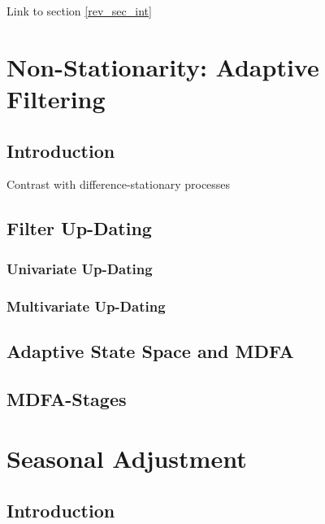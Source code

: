 \documentclass[a4paper]{book}
\begin{document}
Link to section \ref{rev_sec_int}








\chapter{Non-Stationarity: Adaptive Filtering}\label{ada_sec}


\section{Introduction}

Contrast with difference-stationary processes 

\section{Filter Up-Dating}

\subsection{Univariate Up-Dating}

\subsection{Multivariate Up-Dating}


\section{Adaptive State Space and MDFA}


\section{MDFA-Stages}


\chapter{Seasonal Adjustment}\label{sea_sec}


\section{Introduction}
\end{document}
